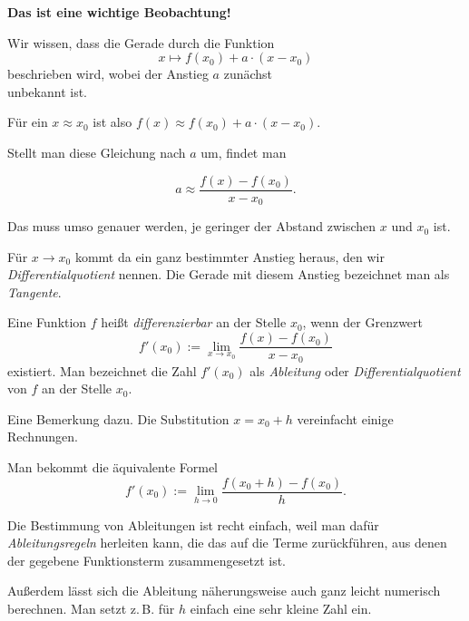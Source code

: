 \documentclass{beamer}
\newcommand{\strong}[1]{\textsf{\textbf{#1}}}
\begin{document}
\begin{frame}
\strong{Das ist eine wichtige Beobachtung!}
\end{frame}

\begin{frame}
Wir wissen, dass die Gerade durch die Funktion
\[x\mapsto f(x_0)+a\cdot (x-x_0)\]
beschrieben wird, wobei der Anstieg $a$ zunächst\\
unbekannt ist.\pause

\vspace{0.8em}
Für ein $x\approx x_0$ ist also $f(x)\approx f(x_0)+a\cdot (x-x_0)$.
\pause

\vspace{0.8em}
Stellt man diese Gleichung nach $a$ um,\pause{} findet man

\[a \approx \frac{f(x)-f(x_0)}{x-x_0}.\]
\end{frame}

\begin{frame}
Das muss umso genauer werden, je geringer der Abstand zwischen
$x$ und $x_0$ ist.\pause

\vspace{0.8em}
Für $x\to x_0$ kommt da ein ganz bestimmter Anstieg heraus, den
wir \emph{Differentialquotient} nennen. Die Gerade mit diesem
Anstieg bezeichnet man als \emph{Tangente}.
\end{frame}

\begin{frame}
\begin{Definition}
Eine Funktion $f$ heißt \emph{differenzierbar}
an der Stelle $x_0$, wenn der Grenzwert
\[f'(x_0) := \lim_{x\to x_0}\frac{f(x)-f(x_0)}{x-x_0}\]
existiert. Man bezeichnet die Zahl $f'(x_0)$ als \emph{Ableitung} oder
\emph{Differentialquotient} von $f$ an der Stelle $x_0$.
\end{Definition}
\end{frame}

\begin{frame}
Eine Bemerkung dazu. Die Substitution $x=x_0+h$ vereinfacht einige
Rechnungen.\pause

\vspace{0.8em}
Man bekommt die äquivalente Formel
\[f'(x_0) := \lim_{h\to 0} \frac{f(x_0+h)-f(x_0)}{h}.\]
\end{frame}

\begin{frame}
Die Bestimmung von Ableitungen ist recht einfach, weil man dafür
\emph{Ableitungsregeln} herleiten kann, die das auf die Terme
zurückführen, aus denen der gegebene Funktionsterm
zusammengesetzt ist.\pause

\vspace{0.8em}
Außerdem lässt sich die Ableitung näherungsweise auch ganz leicht
numerisch berechnen. Man setzt z.\,B. für $h$ einfach eine sehr
kleine Zahl ein.
\end{frame}
\end{document}
